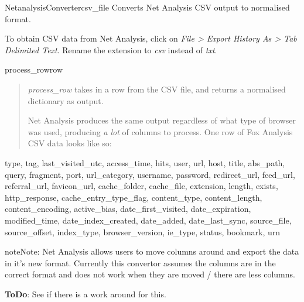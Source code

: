 \documentclass[letterpaper,10pt,english]{manual}
\begin{document}
\hypertarget{webscavator.converters.netanalysis.NetanalysisConverter}{}\begin{classdesc}{NetanalysisConverter}{csv\_file}
Converts Net Analysis CSV output to normalised format.

To obtain CSV data from Net Analysis, click on \emph{File \textgreater{} Export History As \textgreater{} Tab Delimited Text}.
Rename the extension to \emph{csv} instead of \emph{txt}.

\hypertarget{webscavator.converters.netanalysis.NetanalysisConverter.process_row}{}\begin{methoddesc}{process\_row}{row}~\begin{quote}

\emph{process\_row} takes in a row from the CSV file, and returns a normalised dictionary as output.

Net Analysis produces the same output regardless of what type of browser was used, 
producing \emph{a lot} of columns to process. One row of Fox Analysis CSV data looks like so:
\end{quote}

type, tag, last\_visited\_utc, access\_time, hits, user, url, host, title, abs\_path, query, 
fragment, port, url\_category, username, password, redirect\_url, feed\_url, referral\_url, 
favicon\_url, cache\_folder, cache\_file, extension, length, exists, http\_response, 
cache\_entry\_type\_flag, content\_type, content\_length, content\_encoding, active\_bias, 
date\_first\_visited, date\_expiration, modified\_time, date\_index\_created, date\_added, 
date\_last\_sync, source\_file, source\_offset, index\_type, browser\_version, ie\_type, status, 
bookmark, urn

\begin{notice}{note}{Note:}
Net Analysis allows users to move columns around and export the data in it's new format.
Currently this convertor assumes the columns are in the correct format and does not
work when they are moved / there are less columns.

\textbf{ToDo}: See if there is a work around for this.
\end{notice}
\end{methoddesc}
\end{classdesc}
\hypertarget{module-webscavator.converters.csv_converter}{}
\modulesynopsis{}
\end{document}
